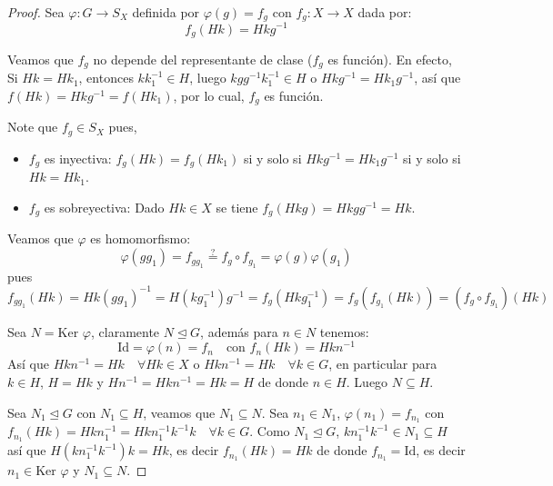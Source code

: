 
\begin{proof}
    Sea $\varphi: G \to S_X$ definida por $\varphi(g) = f_g$ con $f_g: X \to X$ dada por:
    \[ f_g(Hk) = Hkg^{-1} \]
    
    Veamos que $f_g$ no depende del representante de clase ($f_g$ es función).
    En efecto, Si $Hk = Hk_1$, entonces $kk_1^{-1} \in H$, luego $kgg^{-1}k_1^{-1} \in H$ o $Hkg^{-1} = Hk_1g^{-1}$, así que $f(Hk) = Hkg^{-1} = f(Hk_1)$, por lo cual, $f_g$ es función.

    Note que $f_g \in S_X$ pues,
    \begin{itemize}
        \item $f_g$ es inyectiva:
        $f_g(Hk) = f_g(Hk_1)$ si y solo si $Hkg^{-1} = Hk_1g^{-1}$ si y solo si $Hk = Hk_1$.
        
        \item $f_g$ es sobreyectiva:
        Dado $Hk \in X$ se tiene $f_g(Hkg) = Hkgg^{-1} = Hk$.
    \end{itemize}

    Veamos que $\varphi$ es homomorfismo:
    \[ \varphi(gg_1) = f_{gg_1} \overset{?}{=} f_g \circ f_{g_1} = \varphi(g)\varphi(g_1) \]
    pues
    \[ f_{gg_1}(Hk) = Hk(gg_1)^{-1} = H(kg_1^{-1})g^{-1} = f_g(Hkg_1^{-1}) = f_g(f_{g_1}(Hk)) = (f_g \circ f_{g_1})(Hk) \]
    
    Sea $N = \text{Ker } \varphi$, claramente $N \trianglelefteq G$, además para $n \in N$ tenemos:
    \[ \text{Id} = \varphi(n) = f_n \quad \text{con } f_n(Hk) = Hkn^{-1} \]
    Así que $Hkn^{-1} = Hk \quad \forall Hk \in X$ o $Hkn^{-1} = Hk \quad \forall k \in G$, en particular para $k \in H$, $H = Hk$ y $Hn^{-1} = Hkn^{-1} = Hk = H$ de donde $n \in H$. Luego $N \subseteq H$.

    Sea $N_1 \trianglelefteq G$ con $N_1 \subseteq H$, veamos que $N_1 \subseteq N$. Sea $n_1 \in N_1$, $\varphi(n_1) = f_{n_1}$ con $f_{n_1}(Hk) = Hkn_1^{-1} = Hkn_1^{-1}k^{-1}k \quad \forall k \in G$.
    Como $N_1 \trianglelefteq G$, $kn_1^{-1}k^{-1} \in N_1 \subseteq H$ así que $H(kn_1^{-1}k^{-1})k = Hk$, es decir $f_{n_1}(Hk) = Hk$ de donde $f_{n_1} = \text{Id}$, es decir $n_1 \in \text{Ker } \varphi$ y $N_1 \subseteq N$.
\end{proof}

